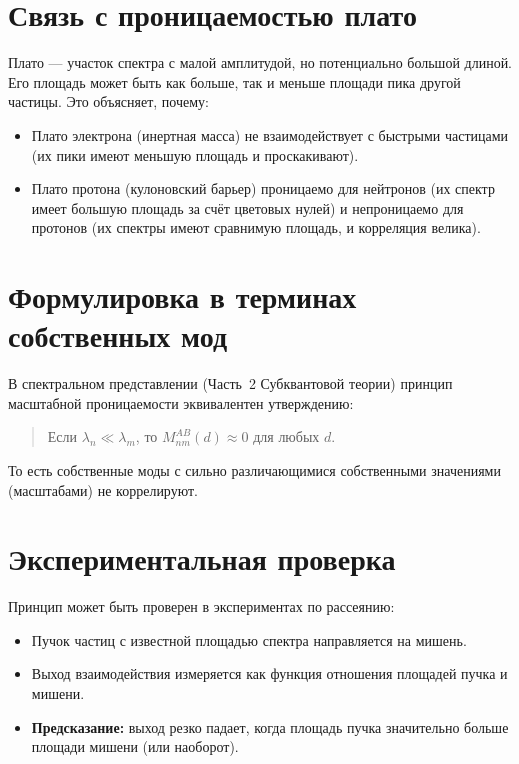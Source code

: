 \documentclass[12pt,a4paper]{article}
\begin{document}
\section{Связь с проницаемостью плато}

Плато — участок спектра с малой амплитудой, но потенциально большой длиной. Его площадь может быть как больше, так и меньше площади пика другой частицы. Это объясняет, почему:

\begin{itemize}
    \item Плато электрона (инертная масса) не взаимодействует с быстрыми частицами (их пики имеют меньшую площадь и проскакивают).
    \item Плато протона (кулоновский барьер) проницаемо для нейтронов (их спектр имеет большую площадь за счёт цветовых нулей) и непроницаемо для протонов (их спектры имеют сравнимую площадь, и корреляция велика).
\end{itemize}

\section{Формулировка в терминах собственных мод}

В спектральном представлении (Часть~2 Субквантовой теории) принцип масштабной проницаемости эквивалентен утверждению:

\begin{quote}
Если $\lambda_n \ll \lambda_m$, то $M_{nm}^{AB}(d) \approx 0$ для любых $d$.
\end{quote}

То есть собственные моды с сильно различающимися собственными значениями (масштабами) не коррелируют.

\section{Экспериментальная проверка}

Принцип может быть проверен в экспериментах по рассеянию:

\begin{itemize}
    \item Пучок частиц с известной площадью спектра направляется на мишень.
    \item Выход взаимодействия измеряется как функция отношения площадей пучка и мишени.
    \item \textbf{Предсказание:} выход резко падает, когда площадь пучка значительно больше площади мишени (или наоборот).
\end{itemize}
\end{document}
